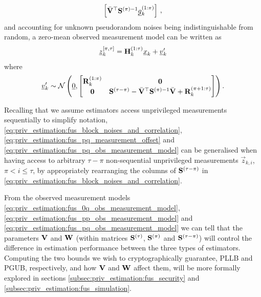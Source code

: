 \begin{description}
\begin{equation}
\begin{bmatrix}
        \bar{{{\mathbf{V}}}}^\top{\ensuremath{{\mathbf{S}}}}^{(\pi)-1}{\underline{g}}_k^{(1:\pi)}
        \end{bmatrix}\,,
    \end{equation}
    and accounting for unknown pseudorandom noises being indistinguishable from random, a zero-mean observed measurement model can be written as
    \begin{equation}\label{eq:priv_estimation:fus_pq_obs_measurement_model}
        {\underline{z}}_k^{[\pi,\tau]} = {{\mathbf{H}}}_k^{(1:\tau)}{\underline{x}}_k + {\underline{v}}_k^{\prime}
    \end{equation}
    where 
    \begin{equation}
        {\underline{v}}_k^{\prime} \sim \mathcal{N}\left({\underline{0}},
        \begin{bmatrix}
            {\ensuremath{{\mathbf{R}}}}_k^{(1:\pi)} & {{\mathbf{0}}}\\
            {{\mathbf{0}}} & {{\mathbf{S}}}^{(\tau-\pi)} - \bar{{{\mathbf{V}}}}^\top{\ensuremath{{\mathbf{S}}}}^{(\pi)-1}\bar{{{\mathbf{V}}}} + {{\mathbf{R}}}_k^{(\pi+1:\tau)}
        \end{bmatrix}\right).
    \end{equation}
\end{description}
\begin{remark}
    Recalling that we assume estimators access unprivileged measurements sequentially to simplify notation, \eqref{eq:priv_estimation:fus_block_noises_and_correlation}, \eqref{eq:priv_estimation:fus_pq_measurement_offset} and \eqref{eq:priv_estimation:fus_pq_obs_measurement_model} can be generalised when having access to arbitrary $\tau-\pi$ non-sequential unprivileged measurements $\vec{z}_{k, i}$, $\pi <i\leq \tau$, by appropriately rearranging the columns of ${{\mathbf{S}}}^{(\tau-\pi)}$ in \eqref{eq:priv_estimation:fus_block_noises_and_correlation}.
\end{remark}

From the observed measurement models \eqref{eq:priv_estimation:fus_0q_obs_measurement_model}, \eqref{eq:priv_estimation:fus_pp_obs_measurement_model} and \eqref{eq:priv_estimation:fus_pq_obs_measurement_model} we can tell that the parameters ${{\mathbf{V}}}$ and ${{\mathbf{W}}}$ (within matrices ${{\mathbf{S}}}^{(\tau)}$, ${{\mathbf{S}}}^{(\pi)}$ and ${{\mathbf{S}}}^{(\tau-\pi)}$) will control the difference in estimation performance between the three types of estimators. Computing the two bounds we wish to cryptographically guarantee, PLLB and PGUB, respectively, and how ${{\mathbf{V}}}$ and ${{\mathbf{W}}}$ affect them, will be more formally explored in sections \ref{subsec:priv_estimation:fus_security} and \ref{subsec:priv_estimation:fus_simulation}.

